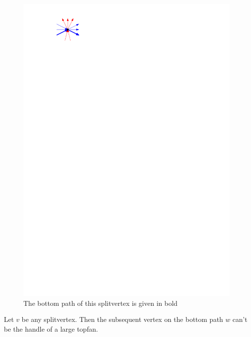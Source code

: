     \begin{figure}[h]
      \centering
      \includegraphics[scale=1]{unifiedAlgo/img/sweep/bottompath.pdf}
      \caption{The bottom path of this splitvertex is given in bold}
      \label{fig:sweep:bottomPath}
    \end{figure}

    \begin{lemma}
      \label{lm:sweep:NoTwoSplitsAboveEachOther}
      Let $v$ be any splitvertex. Then the subsequent vertex on the bottom path $w$ can't be the handle of a large topfan.
    \end{lemma}

